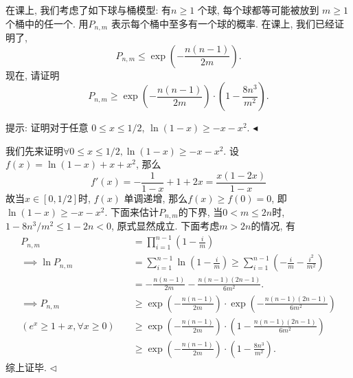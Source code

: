 \documentclass[11pt]{article}
\newenvironment{problem}[2][Problem]{\begin{trivlist}
\item[\hskip \labelsep {\bfseries #1}\hskip \labelsep {\bfseries #2.}]\songti}{\hfill$\blacktriangleleft$\end{trivlist}}
\newenvironment{answer}[1][Solution]{\begin{trivlist}
\item[\hskip \labelsep {\bfseries #1.}\hskip \labelsep]}{\hfill$\lhd$\end{trivlist}}
\newcommand\1{\mathds{1}}
\begin{document}
\begin{problem}{3}
    \songti
    在课上, 我们考虑了如下球与桶模型: 有$n \ge 1$ 个球, 每个球都等可能被放到 $m\ge 1$ 个桶中的任一个. 用$P_{n,m}$ 表示每个桶中至多有一个球的概率. 在课上, 我们已经证明了, \[P_{n,m} \le \exp\left(-\frac{n(n-1)}{2m}\right).\]
    现在, 请证明\[P_{n,m} \ge \exp\left(-\frac{n(n-1)}{2m}\right)\cdot \left(1 - \frac{8n^3}{m^2}\right).\]
    
    {\kaishu 提示: 证明对于任意 $0\le x \le 1/2$, $\ln(1-x) \ge -x - x^2$.}
\end{problem}
\begin{answer}
    我们先来证明$\forall 0\le x \le 1/2, \ln(1-x) \ge -x - x^2$. 设$f(x) = \ln(1-x) + x + x^2$, 那么\[f'(x) = -\frac{1}{1-x} + 1 + 2x = \frac{x(1-2x)}{1-x}\]
    故当$x \in [0,1/2]$时, $f(x)$ 单调递增, 那么$f(x) \ge f(0) = 0$, 即$\ln(1-x) \ge -x - x^2$. 
    下面来估计$P_{n,m}$的下界, 当$0< m \le 2n$时, $1 - 8n^3/m^2 \le 1 - 2n < 0$, 原式显然成立. 下面考虑$m > 2n$的情况, 有
    \begin{align*}
        P_{n,m} &= \prod_{i=1}^{n-1}\left(1 - \frac{i}{m}\right) \\
        \implies \ln P_{n,m} &= \sum_{i=1}^{n-1} \ln\left(1 - \frac{i}{m}\right) \ge \sum_{i=1}^{n-1} \left(-\frac{i}{m} - \frac{i^2}{m^2}\right)  \\
        &= -\frac{n(n-1)}{2m} - \frac{n(n-1)(2n-1)}{6m^2}. \\
        \implies P_{n,m} &\ge \exp\left(-\frac{n(n-1)}{2m}\right)\cdot \exp\left(-\frac{n(n-1)(2n-1)}{6m^2}\right) \\
        (e^x \ge 1 + x, \forall x\ge 0)\quad &\ge \exp\left(-\frac{n(n-1)}{2m}\right)\cdot \left(1 - \frac{n(n-1)(2n-1)}{6m^2}\right) \\
        &\ge \exp\left(-\frac{n(n-1)}{2m}\right)\cdot \left(1 - \frac{8n^3}{m^2}\right). 
    \end{align*}
    综上证毕.
\end{answer}
\end{document}
